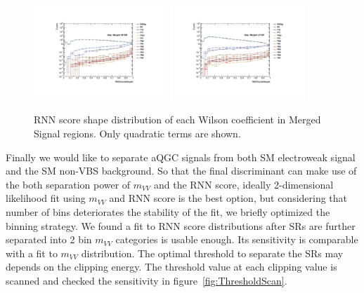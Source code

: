 \begin{figure}[]
    \centering
   \includegraphics[width=0.45\textwidth]{figures/aQGC/RNNScoreMerged_SR_HP_aQGC.pdf}
   \includegraphics[width=0.45\textwidth]{figures/aQGC/RNNScoreMerged_SR_LP_aQGC.pdf}
    \caption{RNN score shape distribution of each Wilson coefficient in Merged Signal regions. Only quadratic terms are shown.}
    \label{fig:2lepaQGCshapeRNNh}
\end{figure}
Finally we would like to separate aQGC signals from both SM electroweak signal and the SM non-VBS background.
So that the final discriminant can make use of the both separation power of $m_{VV}$ and the RNN score, ideally 2-dimensional likelihood fit using $m_{VV}$ and RNN score is the best option, but considering that number of bins deteriorates the stability of the fit, we briefly optimized the binning strategy.
We found a fit to RNN score distributions after SRs are further separated into 2 bin $m_{VV}$ categories is usable enough.
Its sensitivity is comparable with a fit to $m_{VV}$ distribution.
The optimal threshold to separate the SRs may depends on the clipping energy.
The threshold value at each clipping value is scanned and checked the sensitivity in figure~\ref{fig:ThresholdScan}.

